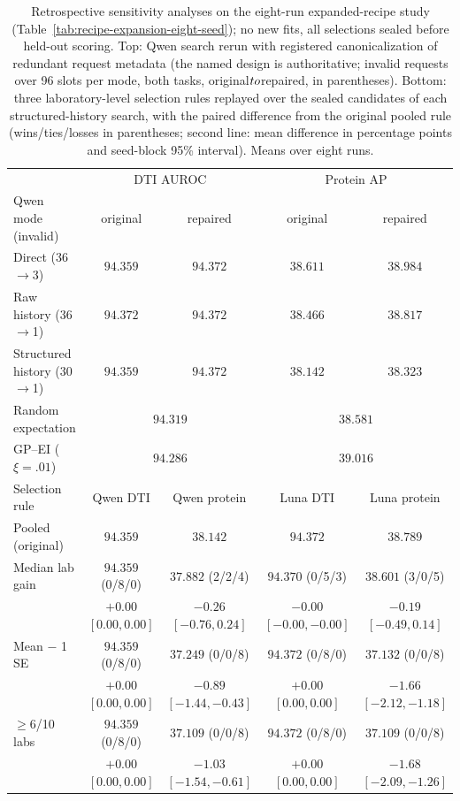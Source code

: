 \begin{table}[htbp]
\caption{Retrospective sensitivity analyses on the eight-run expanded-recipe study (Table~\ref{tab:recipe-expansion-eight-seed}); no new fits, all selections sealed before held-out scoring. Top: Qwen search rerun with registered canonicalization of redundant request metadata (the named design is authoritative; invalid requests over 96 slots per mode, both tasks, original$\\to$repaired, in parentheses). Bottom: three laboratory-level selection rules replayed over the sealed candidates of each structured-history search, with the paired difference from the original pooled rule (wins/ties/losses in parentheses; second line: mean difference in percentage points and seed-block 95\% interval). Means over eight runs.}
\label{tab:round4-repair-selection}
\centering\footnotesize
\setlength{\tabcolsep}{2pt}
\begin{tabular}{lcccc}
\toprule
 & \multicolumn{2}{c}{DTI AUROC} & \multicolumn{2}{c}{Protein AP} \\
Qwen mode (invalid) & original & repaired & original & repaired \\
\midrule
Direct (36$\to$3) & $94.359$ & $94.372$ & $38.611$ & $38.984$ \\
Raw history (36$\to$1) & $94.372$ & $94.372$ & $38.466$ & $38.817$ \\
Structured history (30$\to$1) & $94.359$ & $94.372$ & $38.142$ & $38.323$ \\
Random expectation & \multicolumn{2}{c}{$94.319$} & \multicolumn{2}{c}{$38.581$} \\
GP--EI ($\xi=.01$) & \multicolumn{2}{c}{$94.286$} & \multicolumn{2}{c}{$39.016$} \\
\midrule
Selection rule & Qwen DTI & Qwen protein & Luna DTI & Luna protein \\
\midrule
Pooled (original) & $94.359$ & $38.142$ & $94.372$ & $38.789$ \\
Median lab gain & $94.359$ (0/8/0) & $37.882$ (2/2/4) & $94.370$ (0/5/3) & $38.601$ (3/0/5) \\
 & {\scriptsize$+0.00$ $[0.00, 0.00]$} & {\scriptsize$-0.26$ $[-0.76, 0.24]$} & {\scriptsize$-0.00$ $[-0.00, -0.00]$} & {\scriptsize$-0.19$ $[-0.49, 0.14]$} \\[1pt]
Mean $-$ 1 SE & $94.359$ (0/8/0) & $37.249$ (0/0/8) & $94.372$ (0/8/0) & $37.132$ (0/0/8) \\
 & {\scriptsize$+0.00$ $[0.00, 0.00]$} & {\scriptsize$-0.89$ $[-1.44, -0.43]$} & {\scriptsize$+0.00$ $[0.00, 0.00]$} & {\scriptsize$-1.66$ $[-2.12, -1.18]$} \\[1pt]
$\geq$6/10 labs & $94.359$ (0/8/0) & $37.109$ (0/0/8) & $94.372$ (0/8/0) & $37.109$ (0/0/8) \\
 & {\scriptsize$+0.00$ $[0.00, 0.00]$} & {\scriptsize$-1.03$ $[-1.54, -0.61]$} & {\scriptsize$+0.00$ $[0.00, 0.00]$} & {\scriptsize$-1.68$ $[-2.09, -1.26]$} \\[1pt]
\bottomrule
\end{tabular}
\end{table}
